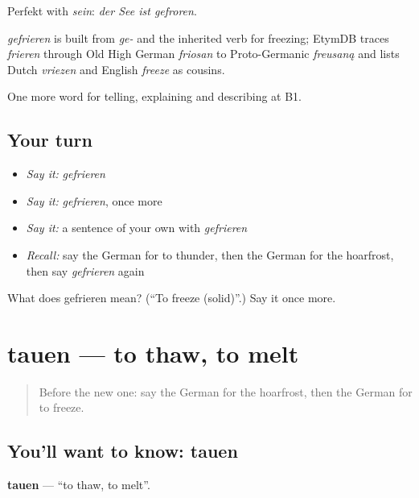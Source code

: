 Perfekt with \emph{sein}: \emph{der See ist gefroren}.

\begin{cousinweb}
\emph{gefrieren} is built from \emph{ge-} and the inherited verb for freezing; EtymDB traces \emph{frieren} through Old High German \emph{friosan} to Proto-Germanic \emph{freusaną} and lists Dutch \emph{vriezen} and English \emph{freeze} as cousins.
\end{cousinweb}

\begin{grammarlens}[title={What you've built}]
One more word for telling, explaining and describing at B1.
\end{grammarlens}

\subsection*{Your turn}
\begin{itemize}
\raggedright
  \item \emph{Say it:} \emph{gefrieren}
  \item \emph{Say it:} \emph{gefrieren}, once more
  \item \emph{Say it:} a sentence of your own with \emph{gefrieren}
  \item \emph{Recall:} say the German for to thunder, then the German for the hoarfrost, then say \emph{gefrieren} again
\end{itemize}

\begin{tcolorbox}[breakable,colback=teal!4,colframe=teal!35!black,title={Before you move on}]
What does gefrieren mean? (\textquotedblleft{}To freeze (solid)\textquotedblright{}.) Say it once more.
\end{tcolorbox}
\section[tauen]{tauen — to thaw, to melt}

\label{lesson:GE-C463-tauen}



\begin{quote}
Before the new one: say the German for the hoarfrost, then the German for to freeze.
\end{quote}

\subsection*{You'll want to know: tauen}
\textbf{tauen} — \textquotedblleft{}to thaw, to melt\textquotedblright{}.

